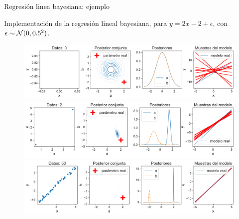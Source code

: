 \documentclass[9pt, handout]{beamer}
\begin{document}
\begin{frame}{Regresión linea bayesiana: ejemplo}

Implementación de la regresión lineal bayesiana, para $y = 2x-2	+ \epsilon$, con $\epsilon\sim{\mathcal N}(0,0.5^2)$. 
	
	\begin{figure}[H]
	\includegraphics[height=0.25\textheight,frame]{../img/cap2_bayesian_lin_reg_0.pdf}\\
	\includegraphics[height=0.25\textheight,frame]{../img/cap2_bayesian_lin_reg_2.pdf}\\
	\includegraphics[height=0.25\textheight,frame]{../img/cap2_bayesian_lin_reg_50.pdf}
\end{figure}

\end{frame}
\end{document}
